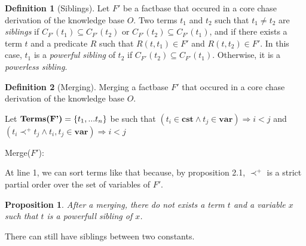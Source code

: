 \documentclass{article}
\newtheorem{proposition}{Proposition}[section]
\theoremstyle{definition}
\newtheorem{definition}{Definition}[section]
\theoremstyle{remark}
\newcommand{\Terms}{\textbf{Terms}}
\begin{document}
\begin{definition}[Siblings]
Let $F'$ be a factbase that occured in a core chase derivation of the knowledge base $O$. Two terms $t_1$ and $t_2$ such that $t_1 \neq t_2$ are \emph{siblings} if $C_{F'}(t_1) \subseteq C_{F'}(t_2)$ or $C_{F'}(t_2) \subseteq C_{F'}(t_1)$, and if there exists a term $t$ and a predicate $R$ such that $R(t,t_1) \in F'$ and $R(t,t_2) \in F'$. In this case, $t_1$ is a \emph{powerful sibling} of $t_2$ if $C_{F'}(t_2) \subseteq C_{F'}(t_1)$. Otherwise, it is a \emph{powerless sibling}.
\end{definition}

\begin{definition}[Merging]
Merging a factbase $F'$ that occured in a core chase derivation of the knowledge base $O$.

\begin{algorithm}[H]
\SetAlgoLined


    Let $\textbf{\Terms(F')} = \{t_1,...t_n\}$ be such that  $(t_i \in \textbf{cst} \wedge t_j \in \textbf{var}) \Rightarrow i < j$ and $(t_i \prec^+ t_j \wedge t_i,t_j \in \textbf{var}) \Rightarrow i < j$ \;
\caption{Merge($F'$):}


\end{algorithm}
At line 1, we can sort terms like that because, by proposition 2.1, $\prec^+$ is a strict partial order over the set of variables of $F'$.
\end{definition}

\begin{proposition}
After a merging, there do not exists a term $t$ and a variable $x$ such that $t$ is a powerfull sibling of $x$.
\end{proposition}

There can still have siblings between two constants.
\end{document}
